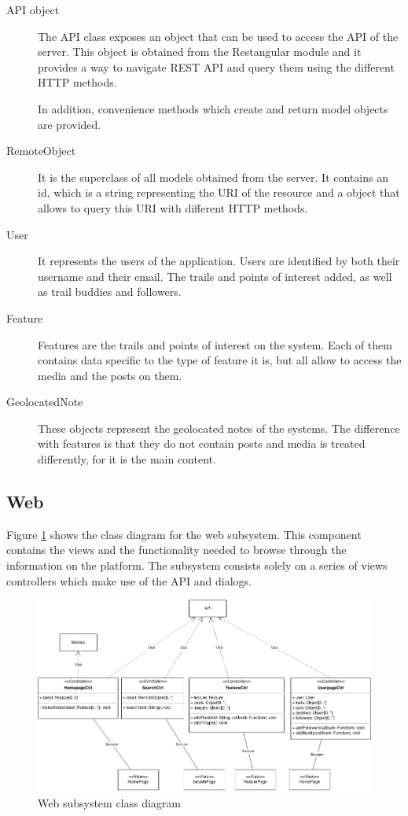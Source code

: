 \begin{description}
\item[API object] The API class exposes an object that can be used to access the API of the server. This object is obtained from the Restangular module and it provides a way to navigate REST API and query them using the different HTTP methods.

In addition, convenience methods which create and return model objects are provided.

\item[RemoteObject] It is the superclass of all models obtained from the server. It contains an id, which is a string representing the URI of the resource and a object that allows to query this URI with different HTTP methods.

\item[User] It represents the users of the application. Users are identified by both their username and their email. The trails and points of interest added, as well as trail buddies and followers.

\item[Feature] Features are the trails and points of interest on the system. Each of them contains data specific to the type of feature it is, but all allow to access the media and the posts on them.

\item[GeolocatedNote] These objects represent the geolocated notes of the systems. The difference with features is that they do not contain posts and media is treated differently, for it is the main content.
\end{description}

\FloatBarrier
\subsection{Web}

Figure \ref{fig:browse-component} shows the class diagram for the web subsystem. This component contains the views and the functionality needed to browse through the information on the platform. The subsystem consists solely on a series of views controllers which make use of the API and dialogs.

\begin{figure}[ht]
  \centering
  \includegraphics[width=.8\textwidth]{fig/browse-component}
  \caption{Web subsystem class diagram}
  \label{fig:browse-component}
\end{figure}

